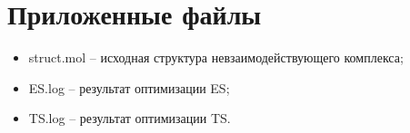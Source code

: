 \section{Приложенные файлы}
\begin{itemize}
    \item struct.mol – исходная структура невзаимодействующего комплекса;
    \item ES.log – результат оптимизации ES;
    \item TS.log – результат оптимизации TS.
\end{itemize}{}